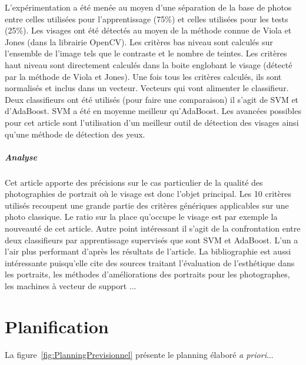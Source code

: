 \documentclass[11pt, french,screen]{report-rd-info}
\begin{document}
L'expérimentation a été menée au moyen d’une séparation de la base de photos entre celles utilisées pour l’apprentissage (75\%) et celles utilisées pour les tests (25\%). Les visages ont été détectés au moyen de la méthode connue de Viola et Jones (dans la librairie OpenCV).
Les critères bas niveau sont calculés sur l’ensemble de l’image tels que le contraste et le nombre de teintes. Les critères haut niveau sont directement calculés dans la boite englobant le visage (détecté par la méthode de Viola et Jones). Une fois tous les critères calculés, ils sont normalisés et inclus dans un vecteur. Vecteurs qui vont alimenter le classifieur. Deux classifieurs ont été utilisés (pour faire une comparaison) il s’agit de SVM et d’AdaBoost. SVM a été en moyenne meilleur qu’AdaBoost.
Les avancées possibles pour cet article sont l’utilisation d’un meilleur outil de détection des visages ainsi qu’une méthode de détection des yeux.
\paragraph{Analyse}
Cet article apporte des précisions sur le cas particulier de la qualité des photographies de portrait où le visage est donc l’objet principal. Les 10 critères utilisés recoupent une grande partie des critères génériques applicables sur une photo classique. Le ratio sur la place qu’occupe le visage est par exemple la nouveauté de cet article.
Autre point intéressant il s’agit de la confrontation entre deux classifieurs par apprentissage supervisés que sont SVM et AdaBoost. L’un a l’air plus performant d’après les résultats de l’article. La bibliographie est aussi intéressante puisqu’elle cite des sources traitant l’évaluation de l’esthétique dans les portraits, les méthodes d’améliorations des portraits pour les photographes, les machines à vecteur de support ...


\chapter{Planification}
La figure~\ref{fig:PlanningPrevisionnel} présente le planning élaboré \emph{a priori}...
\end{document}
